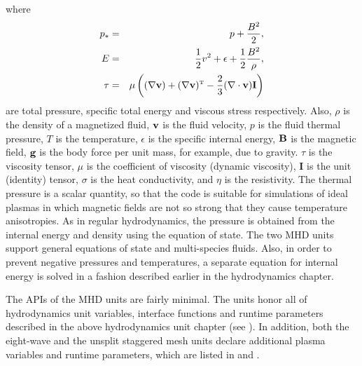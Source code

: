 where
\begin{eqnarray}
p_{\ast} & = & p+\frac{B^2}{2}, \\
E & = & \frac{1}{2}v^2+\epsilon+\frac{1}{2}\frac{B^2}{\rho}, \\
{\bf \tau} & = & \mu \left( (\nabla\textbf{v})+(\nabla\textbf{v})^{\mbox{\tiny T}}-
\frac{2}{3}(\nabla\cdot\textbf{v})\mathbf{I} \right)
\end{eqnarray}
are total pressure, specific total energy and viscous stress respectively. Also,
$\rho$ is the density of a magnetized fluid, $\textbf{v}$ is the fluid velocity,
$p$ is the fluid thermal pressure, $T$ is the temperature, $\epsilon$ is
the specific internal energy, $\textbf{B}$ is the magnetic field, $\textbf{g}$ is the
body force per unit mass, for example, due to gravity.
$\tau$ is the viscosity tensor, $\mu$ is the coefficient of viscosity (dynamic viscosity), 
$\mathbf{I}$ is the unit (identity) tensor,
$\sigma$ is the heat conductivity, and $\eta$ is the resistivity.
The thermal pressure is a scalar quantity, so that the code is
suitable for simulations of ideal plasmas in which magnetic fields
are not so strong that they cause temperature anisotropies.
As in regular hydrodynamics, the pressure is
obtained from the internal energy and density using the equation of state.
The two MHD units support general
equations of state and multi-species fluids.
Also, in order to prevent negative pressures and temperatures,
a separate equation for internal energy is solved in a fashion
described earlier in the hydrodynamics chapter.

The APIs of the MHD units are fairly minimal. The units honor all of
hydrodynamics unit variables, interface functions and runtime
parameters described in the above hydrodynamics unit chapter 
(see ). In addition, both
the eight-wave and the unsplit staggered mesh units
declare additional plasma variables and runtime parameters, which
are listed in  and .

